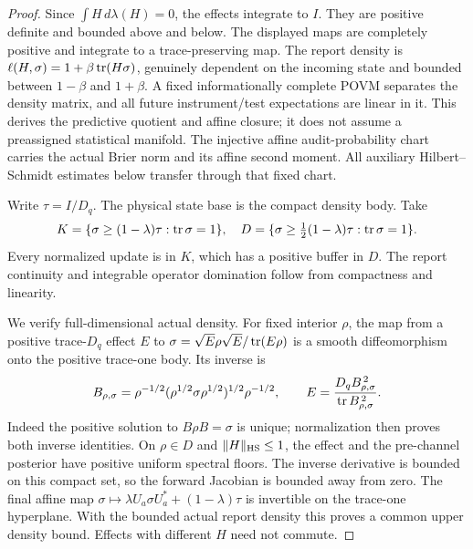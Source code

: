 \begin{proof}
Since $\int H\,d\lambda(H)=0$, the effects integrate to $I$. They are positive definite and bounded above and below. The displayed maps are completely positive and integrate to a trace-preserving map. The report density is $\ell(H,\sigma)=1+\beta\operatorname{tr}(H\sigma)$, genuinely dependent on the incoming state and bounded between $1-\beta$ and $1+\beta$. A fixed informationally complete POVM separates the density matrix, and all future instrument/test expectations are linear in it. This derives the predictive quotient and affine closure; it does not assume a preassigned statistical manifold. The injective affine audit-probability chart carries the actual Brier norm and its affine second moment. All auxiliary Hilbert--Schmidt estimates below transfer through that fixed chart.

Write $\tau=I/D_q$. The physical state base is the compact density body. Take
\[
 K=\{\sigma\ge(1-\lambda)\tau:\operatorname{tr}\sigma=1\},\quad
 D=\{\sigma\ge\tfrac12(1-\lambda)\tau:\operatorname{tr}\sigma=1\}.
\]
Every normalized update is in $K$, which has a positive buffer in $D$. The report continuity and integrable operator domination follow from compactness and linearity.

We verify full-dimensional actual density. For fixed interior $\rho$, the map from a positive trace-$D_q$ effect $E$ to
$\sigma=\sqrt E\rho\sqrt E/\operatorname{tr}(E\rho)$ is a smooth diffeomorphism onto the positive trace-one body. Its inverse is
\[
 B_{\rho,\sigma}=\rho^{-1/2}(\rho^{1/2}\sigma\rho^{1/2})^{1/2}\rho^{-1/2},
 \qquad E=\frac{D_q B_{\rho,\sigma}^{\,2}}{\operatorname{tr} B_{\rho,\sigma}^{\,2}}.
\]
Indeed the positive solution to $B\rho B=\sigma$ is unique; normalization then proves both inverse identities. On $\rho\in D$ and $\lVert H\rVert_{\mathrm{HS}}\le1$, the effect and the pre-channel posterior have positive uniform spectral floors. The inverse derivative is bounded on this compact set, so the forward Jacobian is bounded away from zero. The final affine map $\sigma\mapsto\lambda U_a\sigma U_a^*+(1-\lambda)\tau$ is invertible on the trace-one hyperplane. With the bounded actual report density this proves a common upper density bound. Effects with different $H$ need not commute.


\end{proof}
